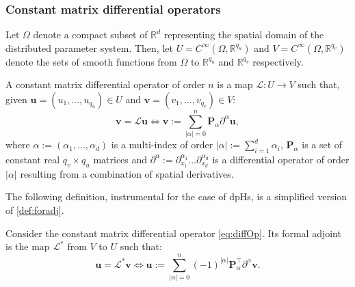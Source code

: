 \subsubsection{Constant matrix differential operators}

Let $\Omega$ denote a compact subset of $\mathbb{R}^d$ representing the spatial domain of the distributed parameter system. Then, let ${U} = C^{\infty}(\Omega, \mathbb{R}^{q_u})$ and ${V}= C^{\infty}(\Omega, \mathbb{R}^{q_v})$ denote the sets of smooth functions from $\Omega$ to $\mathbb{R}^{q_u}$ and $\mathbb{R}^{q_v}$ respectively.
\begin{definition}
	A constant matrix differential operator of order $n$ is a map $\mathcal{L}:{U} \rightarrow {V}$ such that, given $\bm{u} = (u_1 , \dots , u_{q_u}) \in {U}$ and $\bm{v} = (v_1 , . . . , v_{q_v}) \in {V}$:
	\begin{equation}
	\label{eq:diffOp}
	\bm{v} = \mathcal{L} \bm{u} \iff \bm{v} := \sum_{|\alpha|=0}^n  \bm{P}_{\alpha} \partial^{\alpha} \bm{u},
	\end{equation}
	where $\alpha := (\alpha_1, \dots , \alpha_d)$ is a multi-index of order $|\alpha| := \sum_{i=1}^d \alpha_i$, $\bm{P}_\alpha$ is a set of constant real $q_v \times q_u$ matrices and $\partial^{\alpha} := \partial_{x_1}^{\alpha_1} \dots \partial_{x_d}^{\alpha_d}$ is a differential operator of order $|\alpha|$ resulting from a combination of spatial derivatives. 
\end{definition}
The following definition, instrumental for the case of dpHs, is a simplified version of \eqref{def:foradj}.
\begin{definition}
	Consider the constant matrix differential operator \eqref{eq:diffOp}. Its formal adjoint is the map $\mathcal{L}^*$ from ${V}$ to ${U}$ such that:
	\begin{equation}
	\bm{u} = \mathcal{L}^* \bm{v} \iff \bm{u} := \sum_{|\alpha|=0}^n  (-1)^{|\alpha|} \bm{P}_{\alpha}^\top \partial^{\alpha} \bm{v}.
	\end{equation}
\end{definition}


